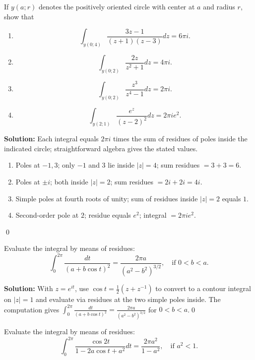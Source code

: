 \begin{problembox}
If \( y(a; r) \) denotes the positively oriented circle with center at \( a \) and radius \( r \), show that
\begin{enumerate}[label=(\alph*)]
\item \[ \int_{y(0;4)} \frac{3z - 1}{(z + 1)(z - 3)} dz = 6\pi i. \]
\item \[ \int_{y(0;2)} \frac{2z}{z^2 + 1} dz = 4\pi i. \]
\item \[ \int_{y(0;2)} \frac{z^3}{z^4 - 1} dz = 2\pi i. \]
\item \[ \int_{y(2;1)} \frac{e^z}{(z - 2)^2} dz = 2\pi ie^2. \]
\end{enumerate}
\end{problembox}

\bigskip\noindent\textbf{Solution:}
Each integral equals $2\pi i$ times the sum of residues of poles inside the indicated circle; straightforward algebra gives the stated values.
\begin{enumerate}[label=(\alph*)]
\item Poles at $-1,3$; only $-1$ and $3$ lie inside $|z|=4$; sum residues $=3+3=6$.
\item Poles at $\pm i$; both inside $|z|=2$; sum residues $=2i+2i=4i$.
\item Simple poles at fourth roots of unity; sum of residues inside $|z|=2$ equals $1$.
\item Second-order pole at $2$; residue equals $e^2$; integral $=2\pi i e^2$.
\end{enumerate}\qed


\begin{problembox}
Evaluate the integral by means of residues:
\[ \int_0^{2\pi} \frac{dt}{(a + b \cos t)^2} = \frac{2\pi a}{(a^2 - b^2)^{3/2}}, \quad \text{if } 0 < b < a. \]
\end{problembox}

\bigskip\noindent\textbf{Solution:}
With $z=e^{it}$, use $\cos t=\tfrac12(z+z^{-1})$ to convert to a contour integral on $|z|=1$ and evaluate via residues at the two simple poles inside. The computation gives $\int_0^{2\pi}\frac{dt}{(a+b\cos t)^2}=\frac{2\pi a}{(a^2-b^2)^{3/2}}$ for $0<b<a$.\qed


\begin{problembox}
Evaluate the integral by means of residues:
\[ \int_0^{2\pi} \frac{\cos 2t}{1 - 2a \cos t + a^2} dt = \frac{2\pi a^2}{1 - a^2}, \quad \text{if } a^2 < 1. \]
\end{problembox}

